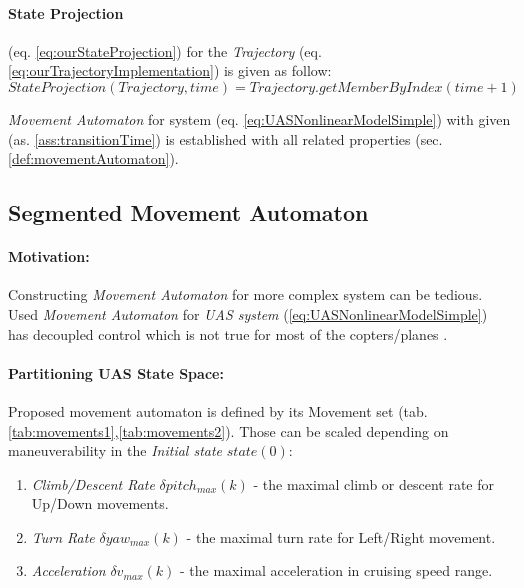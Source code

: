 \paragraph{State Projection} (eq. \ref{eq:ourStateProjection}) for the \emph{Trajectory} (eq. \ref{eq:ourTrajectoryImplementation}) is given as follow:
\begin{equation}\label{eq:ourStateProjection}
    StateProjection(Trajectory,time) = Trajectory.getMemberByIndex(time+1)
\end{equation}

\begin{note}
    \emph{Movement Automaton} for system (eq. \ref{eq:UASNonlinearModelSimple}) with given (as. \ref{ass:transitionTime}) is established with all related properties (sec. \ref{def:movementAutomaton}).
\end{note}

\subsection{Segmented Movement Automaton}\label{s:segmentedMovementAutomaton}
\paragraph{Motivation:} Constructing \emph{Movement Automaton} for more complex system can be tedious. Used \emph{Movement Automaton} for \emph{UAS system} (\ref{eq:UASNonlinearModelSimple}) has decoupled control which is not true for most of the copters/planes \cite{fossen2011mathematical}.

\paragraph{Partitioning UAS State Space:} Proposed movement automaton is defined by its Movement set (tab. \ref{tab:movements1},\ref{tab:movements2}). Those can be scaled depending on maneuverability in the  \emph{Initial state} $state(0)$:
\begin{enumerate}
    \item \emph{Climb/Descent Rate} $\delta pitch_{max}(k)$ - the maximal climb or descent rate for Up/Down movements.
    \item \emph{Turn Rate} $\delta yaw_{max}(k)$ - the maximal turn rate for Left/Right movement.
    \item \emph{Acceleration} $\delta v_{max}(k)$ - the maximal acceleration in cruising speed range.
\end{enumerate}

